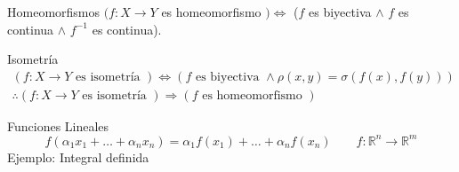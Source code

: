 \documentclass[a4paper,11pt]{article}
\begin{document}
\begin{definicion*}{Homeomorfismos}{}
  $(f: X \to Y$ es homeomorfismo $) \Leftrightarrow$ ($f$ es biyectiva $\wedge$ $f$ es continua $\wedge$ $f^{-1}$ es continua).
\end{definicion*}

\begin{definicion*}{Isometría}{} 
  \begin{equation*}
  \begin{array}{c}
    (f: X \to Y \text{ es isometría }) \Leftrightarrow (f \text{ es biyectiva } \wedge \rho(x,y) = \sigma(f(x),f(y)))\\
    \therefore (f: X \to Y \text{ es isometría }) \Rightarrow (f \text{ es homeomorfismo })
  \end{array}
  \end{equation*}
\end{definicion*}

\begin{definicion*}{Funciones Lineales}{}
  \begin{equation*}
    f(\alpha_1 x_1 + \dots + \alpha_n x_n) = \alpha_1 f(x_1) + \dots + \alpha_n f(x_n) \qquad f: \mathbb{R}^n \to \mathbb{R}^m 
  \end{equation*}
  Ejemplo: Integral definida
\end{definicion*}
\end{document}
